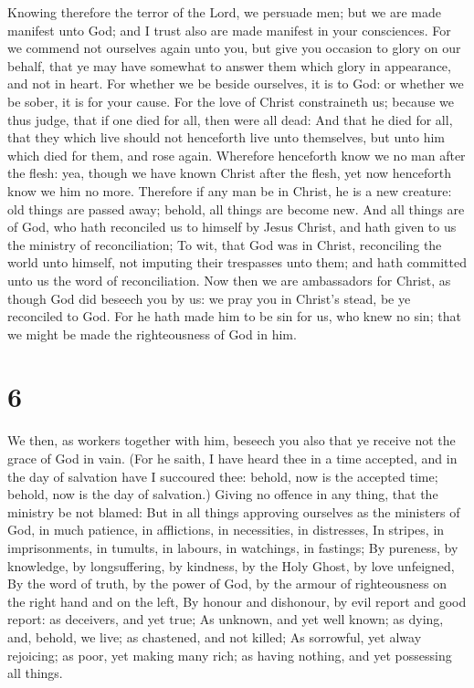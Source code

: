  Knowing therefore the terror of the Lord, we persuade men;
but we are made manifest unto God; and I trust also are made manifest in
your consciences.  For we commend not ourselves again unto
you, but give you occasion to glory on our behalf, that ye may have
somewhat to answer them which glory in appearance, and not in heart.
 For whether we be beside ourselves, it is to God: or
whether we be sober, it is for your cause.  For the love of
Christ constraineth us; because we thus judge, that if one died for all,
then were all dead:  And that he died for all, that they
which live should not henceforth live unto themselves, but unto him
which died for them, and rose again.  Wherefore henceforth
know we no man after the flesh: yea, though we have known Christ after
the flesh, yet now henceforth know we him no more. 
Therefore if any man be in Christ, he is a new creature: old things are
passed away; behold, all things are become new.  And all
things are of God, who hath reconciled us to himself by Jesus Christ,
and hath given to us the ministry of reconciliation;  To
wit, that God was in Christ, reconciling the world unto himself, not
imputing their trespasses unto them; and hath committed unto us the word
of reconciliation.  Now then we are ambassadors for Christ,
as though God did beseech you by us: we pray you in Christ's stead, be
ye reconciled to God.  For he hath made him to be sin for
us, who knew no sin; that we might be made the righteousness of God in
him.

\hypertarget{section-5}{%
\section{6}\label{section-5}}

 We then, as workers together with him, beseech you also
that ye receive not the grace of God in vain.  (For he
saith, I have heard thee in a time accepted, and in the day of salvation
have I succoured thee: behold, now is the accepted time; behold, now is
the day of salvation.)  Giving no offence in any thing, that
the ministry be not blamed:  But in all things approving
ourselves as the ministers of God, in much patience, in afflictions, in
necessities, in distresses,  In stripes, in imprisonments,
in tumults, in labours, in watchings, in fastings;  By
pureness, by knowledge, by longsuffering, by kindness, by the Holy
Ghost, by love unfeigned,  By the word of truth, by the
power of God, by the armour of righteousness on the right hand and on
the left,  By honour and dishonour, by evil report and good
report: as deceivers, and yet true;  As unknown, and yet
well known; as dying, and, behold, we live; as chastened, and not
killed;  As sorrowful, yet alway rejoicing; as poor, yet
making many rich; as having nothing, and yet possessing all things.

